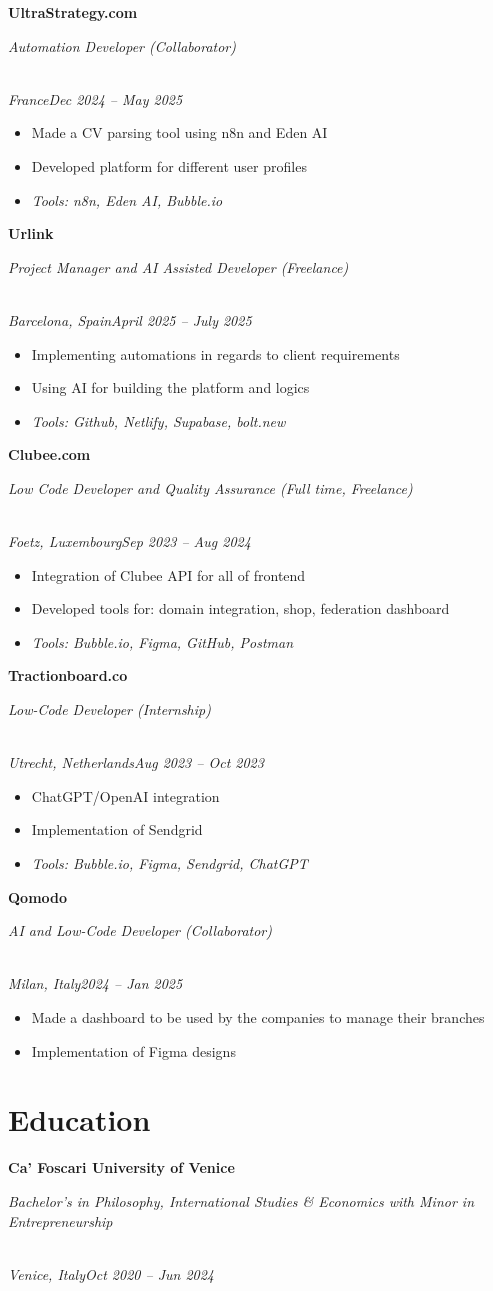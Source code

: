 \documentclass[a4paper,10pt]{article}
\newcommand{\role}[4]{\vspace{3pt}\noindent\hspace{0.6em}\parbox[t]{0.38\textwidth}{\raggedright\textbf{#1}}\hfill\parbox[t]{0.58\textwidth}{\raggedleft\textit{#2}}\\{\textit{#3}\hfill\textit{#4}}\vspace{1pt}}
\begin{document}
\role{UltraStrategy.com}{Automation Developer (Collaborator)}{France}{Dec 2024 -- May 2025}
\begin{itemize}
\item Made a CV parsing tool using n8n and Eden AI
\item Developed platform for different user profiles
\item \textit{Tools: n8n, Eden AI, Bubble.io}
\end{itemize}

\role{Urlink}{Project Manager and AI Assisted Developer (Freelance)}{Barcelona, Spain}{April 2025 -- July 2025}
\begin{itemize}
\item Implementing automations in regards to client requirements
\item Using AI for building the platform and logics
\item \textit{Tools: Github, Netlify, Supabase, bolt.new}
\end{itemize}

\role{Clubee.com}{Low Code Developer and Quality Assurance (Full time, Freelance)}{Foetz, Luxembourg}{Sep 2023 -- Aug 2024}
\begin{itemize}
\item Integration of Clubee API for all of frontend
\item Developed tools for: domain integration, shop, federation dashboard
\item \textit{Tools: Bubble.io, Figma, GitHub, Postman}
\end{itemize}

\role{Tractionboard.co}{Low-Code Developer (Internship)}{Utrecht, Netherlands}{Aug 2023 -- Oct 2023}
\begin{itemize}
\item ChatGPT/OpenAI integration
\item Implementation of Sendgrid
\item \textit{Tools: Bubble.io, Figma, Sendgrid, ChatGPT}
\end{itemize}

\role{Qomodo}{AI and Low-Code Developer (Collaborator)}{Milan, Italy}{2024 -- Jan 2025}
\begin{itemize}
\item Made a dashboard to be used by the companies to manage their branches
\item Implementation of Figma designs
\end{itemize}

\section{Education}
\role{Ca' Foscari University of Venice}{Bachelor's in Philosophy, International Studies \& Economics with Minor in Entrepreneurship}{Venice, Italy}{Oct 2020 -- Jun 2024}
\end{document}

